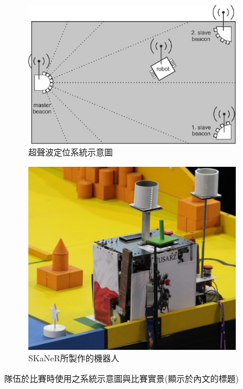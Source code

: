 \begin{figure}[htbp]
    \centering
    \begin{subfigure}[b]{0.48\textwidth}
        \centering
        \includegraphics[width=\textwidth]{figsrc/ch01/eurobot_2012_ultrasonic_300dpi.png}
        \caption{超聲波定位系統示意圖\cite{eurobot_ultrasound_2013}}
        \label{fig:eurobot_2013_ultrasound}
    \end{subfigure}
    \hfill
    \begin{subfigure}[b]{0.48\textwidth}
        \centering
        \includegraphics[width=\textwidth]{figsrc/ch01/eurobot_ros_2016_300dpi.png}
        \caption{SKaNeR所製作的機器人\cite{eurobot_ros_2016}}
        \label{fig:eurobot_ros_2016}
    \end{subfigure}
    \caption[隊伍於比賽時使用之系統示意圖與比賽實景(顯示於目錄的標題)]{隊伍於比賽時使用之系統示意圖與比賽實景(顯示於內文的標題)}
    \label{fig:eurobot_2013_2016}
\end{figure}

